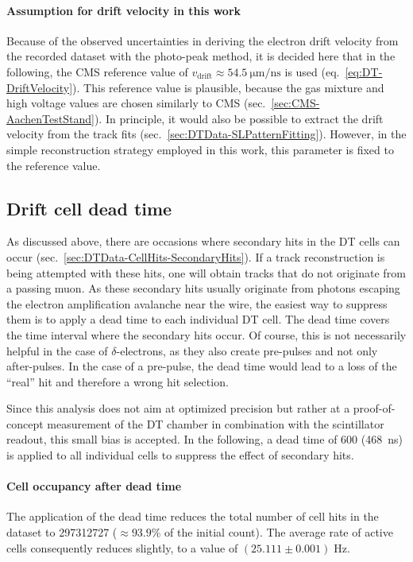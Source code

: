 \paragraph{Assumption for drift velocity in this work}
Because of the observed uncertainties in deriving the electron drift velocity from the recorded dataset with the photo-peak method, it is decided here that in the following, the \ac{CMS} reference value of $v_\text{drift}\approx\SI{54.5}{\micro\meter/\nano\second}$ is used (eq.\ \ref{eq:DT-DriftVelocity}). This reference value is plausible, because the gas mixture and high voltage values are chosen similarly to \ac{CMS} (sec.\ \ref{sec:CMS-AachenTestStand}). In principle, it would also be possible to extract the drift velocity from the track fits (sec.\ \ref{sec:DTData-SLPatternFitting}). However, in the simple reconstruction strategy employed in this work, this parameter is fixed to the reference value. %

\subsection{Drift cell dead time}
\label{sec:DTData-CellHits-DeadTime}
As discussed above, there are occasions where secondary hits in the \ac{DT} cells can occur (sec.\ \ref{sec:DTData-CellHits-SecondaryHits}). If a track reconstruction is being attempted with these hits, one will obtain tracks that do not originate from a passing muon. As these secondary hits usually originate from photons escaping the electron amplification avalanche near the wire, the easiest way to suppress them is to apply a dead time to each individual \ac{DT} cell.  The dead time covers the time interval where the secondary hits occur. Of course, this is not necessarily helpful in the case of $\delta$-electrons, as they also create pre-pulses and not only after-pulses. In the case of a pre-pulse, the dead time would lead to a loss of the \enquote{real} hit and therefore a wrong hit selection.
\par Since this analysis does not aim at optimized precision but rather at a proof-of-concept measurement of the \ac{DT} chamber in combination with the scintillator readout, this small bias is accepted. In the following, a dead time of \SI{600}{\tu} (\SI{468}{\nano\second}) is applied to all individual cells to suppress the effect of secondary hits.
\paragraph{Cell occupancy after dead time}
The application of the dead time reduces the total number of cell hits in the dataset to \num{297312727} ($\approx 93.9\%$ of the initial count). The average rate of active cells consequently reduces slightly, to a value of $(25.111 \pm 0.001)\;\si{\hertz}$.




